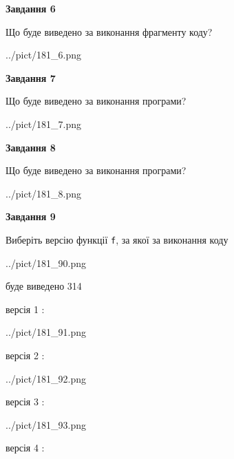 \documentclass[12pt, ukrainian]{article}
\def\code#1{\Verb!#1!}
\begin{document}
{\begin {large}
{\begin {center}\textbf{Завдання 6}\end {center}}

Що буде виведено за виконання фрагменту коду?\par
\begin{center}
	{../pict/181_6.png}
\end{center}
\newpage

{\begin {center}\textbf{Завдання 7}\end {center}}

Що буде виведено за виконання програми?\par
\begin{center}
	{../pict/181_7.png}
\end{center}
\newpage

{\begin {center}\textbf{Завдання 8}\end {center}}

Що буде виведено за виконання програми?\par
\begin{center}
	{../pict/181_8.png}
\end{center}
\newpage

{\begin {center}\textbf{Завдання 9}\end {center}}

Виберіть версію функції \code{f}, за якої за виконання коду
\begin{center}
	{../pict/181_90.png}
\end{center}
буде виведено 314

\vspace{5mm}
версія 1 :

\begin{center}
	{../pict/181_91.png}
\end{center}
версія 2 :

\begin{center}
	{../pict/181_92.png}
\end{center}
версія 3 :

\begin{center}
	{../pict/181_93.png}
\end{center}
версія 4 :


\end{large}}
\end{document}
